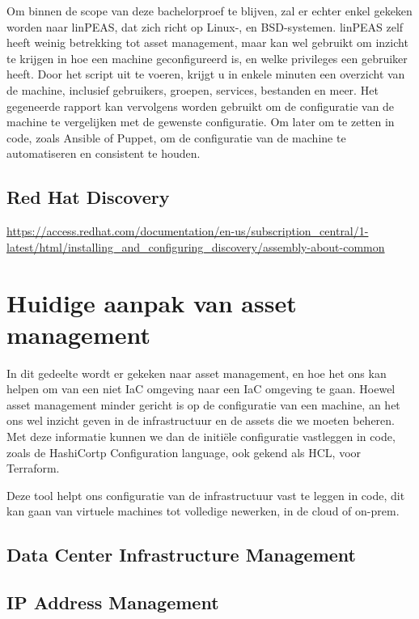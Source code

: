 Om binnen de scope van deze bachelorproef te blijven, zal er echter enkel gekeken worden naar linPEAS, dat zich richt op Linux-, en BSD-systemen.
linPEAS zelf heeft weinig betrekking tot asset management, maar kan wel gebruikt om inzicht te krijgen in hoe een machine geconfigureerd is, en welke privileges een gebruiker heeft.
Door het script uit te voeren, krijgt u in enkele minuten een overzicht van de machine, inclusief gebruikers, groepen, services, bestanden en meer.
Het gegeneerde rapport kan vervolgens worden gebruikt om de configuratie van de machine te vergelijken met de gewenste configuratie.
Om later om te zetten in code, zoals Ansible of Puppet, om de configuratie van de machine te automatiseren en consistent te houden.

\subsection{Red Hat Discovery}
\label{sub:red-hat-discovery}

\url{https://access.redhat.com/documentation/en-us/subscription_central/1-latest/html/installing_and_configuring_discovery/assembly-about-common}

\section{Huidige aanpak van asset management}%
\label{sec:huidige-aanpak-van-asset-management}

In dit gedeelte wordt er gekeken naar asset management, en hoe het ons kan helpen om van een niet IaC omgeving naar een IaC omgeving te gaan.
Hoewel asset management minder gericht is op de configuratie van een machine, an het ons wel inzicht geven in de infrastructuur en de assets die we moeten beheren.
Met deze informatie kunnen we dan de initi\"ele configuratie vastleggen in code, zoals de HashiCortp Configuration language, ook gekend als HCL, voor Terraform.

Deze tool helpt ons configuratie van de infrastructuur vast te leggen in code, dit kan gaan van virtuele machines tot volledige newerken, in de cloud of on-prem.

\subsection{Data Center Infrastructure Management}
\label{sub:dcim}

\subsection{IP Address Management}
\label{sub:ipam}

